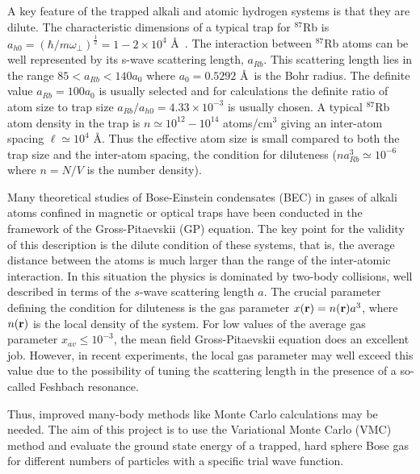\documentclass[10pt]{article}
\begin{document}
 A key feature of the trapped alkali and atomic hydrogen systems is that they are
 dilute. The characteristic dimensions of a typical trap for $^{87}$Rb is
 $a_{h0}=\left( {\hbar}/{m\omega_\perp}\right)^\frac{1}{2}=1-2 \times 10^4$
 \AA\ . The interaction between $^{87}$Rb atoms can be well represented
 by its s-wave scattering length, $a_{Rb}$. This scattering length lies in the
 range $85 < a_{Rb} < 140 a_0$ where $a_0 = 0.5292$ \AA\ is the Bohr radius.
 The definite value $a_{Rb} = 100 a_0$ is usually selected and
 for calculations the definite ratio of atom size to trap size 
 $a_{Rb}/a_{h0} = 4.33 \times 10^{-3}$ 
 is usually chosen. A typical $^{87}$Rb atom
 density in the trap is $n \simeq 10^{12}- 10^{14}$ atoms/cm$^3$ giving an
 inter-atom spacing $\ell \simeq 10^4$ \AA. Thus the effective atom size is small
 compared to both the trap size and the inter-atom spacing, the condition
 for diluteness ($na^3_{Rb} \simeq 10^{-6}$ where $n = N/V$ is the number
 density). 

Many theoretical studies of Bose-Einstein condensates (BEC) in gases
of alkali atoms confined in magnetic or optical traps have been
conducted in the framework of the Gross-Pitaevskii (GP) equation.  The
key point for the validity of this description is the dilute condition
of these systems, that is, the average distance between the atoms is
much larger than the range of the inter-atomic interaction. In this
situation the physics is dominated by two-body collisions, well
described in terms of the $s$-wave scattering length $a$.  The crucial
parameter defining the condition for diluteness is the gas parameter
$x({\bf r})= n({\bf r}) a^3$, where $n({\bf r})$ is the local density
of the system. For low values of the average gas parameter $x_{av}\le
10^{-3}$, the mean field Gross-Pitaevskii equation does an excellent
job.  However,
in recent experiments, the local gas parameter may well exceed this
value due to the possibility of tuning the scattering length in the
presence of a so-called Feshbach resonance.

Thus, improved many-body methods like Monte Carlo calculations may be
needed.  The aim of this project is to use the Variational Monte Carlo
(VMC) method and evaluate the ground state energy of a trapped, hard
sphere Bose gas for different numbers of particles with a specific
trial wave function.
\end{document}
